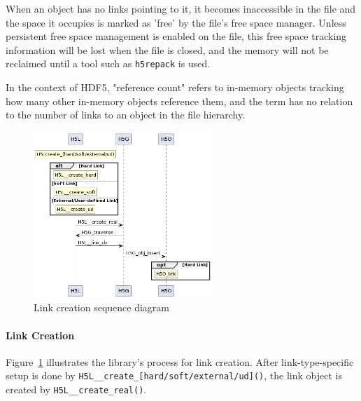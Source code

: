 When an object has no links pointing to it, it becomes inaccessible in the file and the space it occupies is marked as 'free' by the file's free space manager. Unless persistent free space management is enabled on the file, this free space tracking information will be lost when the file is closed, and the memory will not be reclaimed until a tool such as \texttt{h5repack} is used.

In the context of HDF5, "reference count" refers to in-memory objects tracking how many other in-memory objects reference them, and the term has no relation to the number of links to an object in the file hierarchy.

\begin{figure}
    \centering
    \includegraphics[width=0.6\textwidth]{images/tour_4_uml_link_create.png}
    \caption{Link creation sequence diagram}
    \label{fig:tour-4-uml-link-create}
\end{figure}

\paragraph{Link Creation} Figure~\ref{fig:tour-4-uml-link-create} illustrates the library's process for link creation. After link-type-specific setup is done by \texttt{H5L\_\_create\_[hard/soft/external/ud]()}, the link object is created by \texttt{H5L\_\_create\_real()}.

